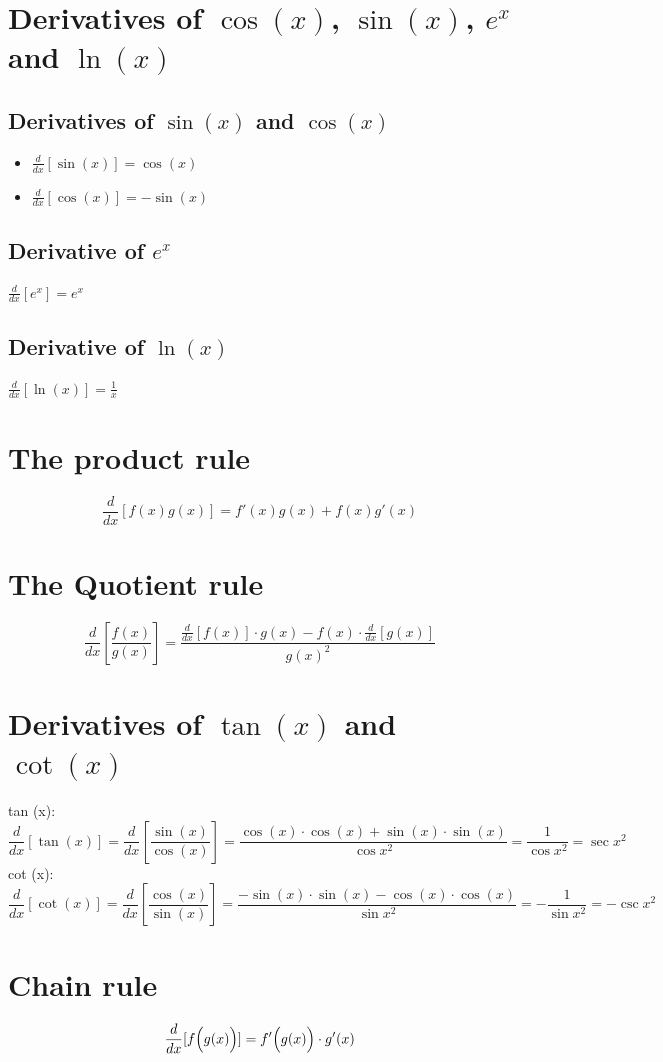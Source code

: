 \documentclass{article}
\begin{document}
\section{Derivatives of \(\cos(x)\), \(\sin(x)\), \(e^x\) and \(\ln (x)\)}
\subsection{Derivatives of \(\sin(x)\) and \(\cos(x)\)}
    \begin{itemize}
        \item \(\frac{d}{dx}[\sin(x)] = \cos(x)\)
        \item \(\frac{d}{dx}[\cos(x)] = -\sin(x)\)
    \end{itemize}
\subsection{Derivative of \(e^x\)}
    \(\frac{d}{dx}[e^x] = e ^ x\)
\subsection{Derivative of \(\ln (x)\)}
    \(\frac{d}{dx}[\ln (x)] =\frac{1}{x}\)
\section{The product rule}
    \[\frac{d}{dx}[f(x)g(x)] = f'(x)g(x) + f(x)g'(x)\]
\section{The Quotient rule}
    \[\frac{d}{dx}\left[\frac{f(x)}{g(x)}\right] = \frac{\frac{d}{dx}[f(x)] \cdot g(x) - f(x) \cdot \frac{d}{dx}[g(x)]}{{g(x)}^2}\]
\section{Derivatives of  \(\tan(x)\) and \(\cot(x)\)}
    tan (x): 
        \[\frac{d}{dx}[\tan(x)] = \frac{d}{dx} \left[ \frac{\sin(x)}{\cos(x)} \right] = \frac{\cos(x) \cdot \cos(x) + \sin(x) \cdot \sin(x) }{\cos{x}^2 } = \frac{1}{\cos{x}^2} = \sec{x}^2 \]
    cot (x): 
        \[\frac{d}{dx}[\cot(x)] = \frac{d}{dx} \left[ \frac{\cos(x)}{\sin(x)} \right] = \frac{-\sin(x) \cdot \sin(x) - \cos(x) \cdot \cos(x) }{\sin{x}^2 } = -\frac{1}{\sin{x}^2} = -\csc{x}^2 \]
\section{Chain rule}
      \[\frac{d}{dx}[f\Bigl(g(x)\Bigr)] = f'\Bigl(g(x)\Bigr) \cdot g'(x)\]
\end{document}
